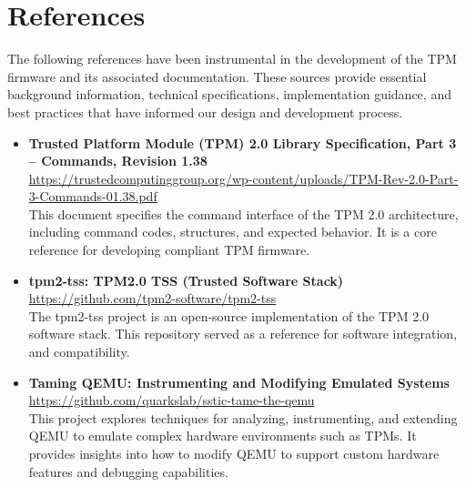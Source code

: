 
\chapter{References}
\label{chap5}

The following references have been instrumental in 
the development of the TPM firmware and its associated 
documentation. These sources provide essential 
background information, technical specifications, 
implementation guidance, and best practices that
have informed our design and development process.


\begin{itemize}
    \item \textbf{Trusted Platform Module (TPM) 2.0 Library Specification, Part 3 – Commands, Revision 1.38} \\
    \url{https://trustedcomputinggroup.org/wp-content/uploads/TPM-Rev-2.0-Part-3-Commands-01.38.pdf} \\
    This document specifies the command interface of the TPM 2.0 architecture, including command codes, structures, and expected behavior. 
    It is a core reference for developing compliant TPM firmware.

    \item \textbf{tpm2-tss: TPM2.0 TSS (Trusted Software Stack)} \\
    \url{https://github.com/tpm2-software/tpm2-tss} \\
    The tpm2-tss project is an open-source implementation of the TPM 2.0 software stack. This repository served as a reference for software integration, 
    and compatibility.

    \item \textbf{Taming QEMU: Instrumenting and Modifying Emulated Systems} \\
    \url{https://github.com/quarkslab/sstic-tame-the-qemu} \\
    This project explores techniques for analyzing, instrumenting,
    and extending QEMU to emulate complex hardware environments 
    such as TPMs. It provides insights into how to modify QEMU
    to support custom hardware features and debugging capabilities.
    
    
\end{itemize}
